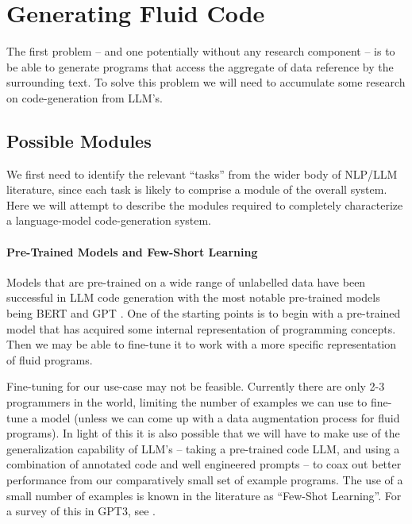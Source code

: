 \section{Generating Fluid Code}
\label{sec:generate-fluid}

The first problem -- and one potentially without any research component -- is to be able
to generate  programs that access the aggregate of data reference by the surrounding text.
To solve this problem we will need to accumulate some research on code-generation from LLM's.

\subsection{Possible Modules}
We first need to identify the relevant ``tasks'' from the wider body of NLP/LLM literature,
since each task is likely to comprise a module of the overall system. Here we will attempt
to describe the modules required to completely characterize a language-model code-generation
system.

\paragraph*{Pre-Trained Models and Few-Short Learning}
Models that are pre-trained on a wide range of unlabelled data have been successful in LLM
code generation with the most notable pre-trained models being BERT \citep{devlin2019}
and GPT \citep{radford2018}. One of the starting points is to begin with a pre-trained model
that has acquired some internal representation of programming concepts. Then we may be able
to fine-tune it to work with a more specific representation of fluid programs.

Fine-tuning for our use-case may not be feasible. Currently there are only 2-3 
programmers in the world, limiting the number of examples we can use to fine-tune a model 
(unless we can come up with a data augmentation process for fluid programs). In light of this
it is also possible that we will have to make use of the generalization capability of 
LLM's -- taking a pre-trained code LLM, and using a combination of annotated code and 
well engineered prompts -- to coax out better performance from our comparatively small
set of example programs. The use of a small number of examples is known in the literature
as ``Few-Shot Learning''. For a survey of this in GPT3, see \citet{brown2020neurips}.

